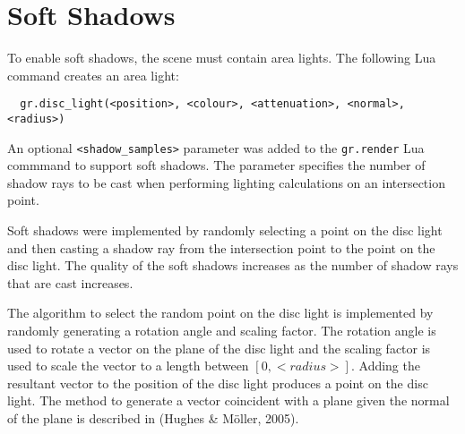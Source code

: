\section{Soft Shadows}

To enable soft shadows, the scene must contain area lights. The following Lua 
command creates an area light:
\begin{lstlisting}
  gr.disc_light(<position>, <colour>, <attenuation>, <normal>, <radius>)
\end{lstlisting}
  
An optional \verb|<shadow_samples>| parameter was added to the \verb|gr.render|
Lua commmand to support soft shadows. The parameter specifies the number of
shadow rays to be cast when performing lighting calculations on an intersection
point.

Soft shadows were implemented by randomly selecting a point on the disc light
and then casting a shadow ray from the intersection point to the point on the
disc light. The quality of the soft shadows increases as the number of shadow
rays that are cast increases.

The algorithm to select the random point on the disc light is implemented by
randomly generating a rotation angle and scaling factor. The rotation angle is
used to rotate a vector on the plane of the disc light and the scaling factor is 
used to scale the vector to a length between $[0, <radius>]$. Adding the 
resultant vector to the position of the disc light produces a point on the disc
light. The method to generate a vector coincident with a plane given the normal
of the plane is described in (Hughes & M{\"o}ller, 2005).

